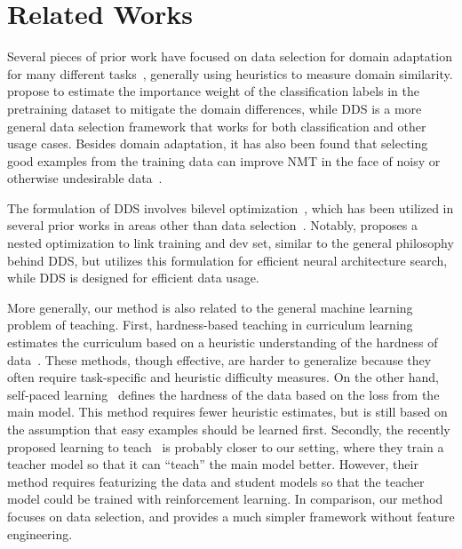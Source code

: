 \section{\label{sec:related_work}Related Works}

Several pieces of prior work have focused on data selection for domain adaptation for many different tasks~\citep{moore2010intelligent,axelrod2011domain,domain_adapt_transfer,jiang-zhai-2007-instance,foster-etal-2010-discriminative,wang-etal-2017-instance}, generally using heuristics to measure domain similarity.
\cite{domain_adapt_transfer} propose to estimate the importance weight of the classification labels in the pretraining dataset to mitigate the domain differences, while DDS is a more general data selection framework that works for both classification and other usage cases.
Besides domain adaptation, it has also been found that selecting good examples from the training data can improve NMT in the face of noisy or otherwise undesirable data~\citep{vyas-etal-2018-identifying,pham-etal-2018-fixing}.  

The formulation of DDS involves bilevel optimization~\citep{bilevel_optim,hier_optim}, which has been utilized in several prior works in areas other than data selection~\citep{darts,hyper_grad,finn2017model}.
Notably, \cite{darts} proposes a nested optimization to link training and dev set, similar to the general philosophy behind DDS, but utilizes this formulation for efficient neural architecture search, while DDS is designed for efficient data usage.

More generally, our method is also related to the general machine learning problem of teaching. First, hardness-based teaching in curriculum learning estimates the curriculum based on a heuristic understanding of the hardness of data~\citep{cl_bengio,automate_cl_GravesBMMK17,SpitkovskyAJ10,zhang2016boosting,zhang2018empirical,platanios19naacl,baysian_curriculum}. These methods, though effective, are harder to generalize because they often require task-specific and heuristic difficulty measures. On the other hand, self-paced learning~\citep{spl_visual_category,spl_kumar,spl_visual_category} defines the hardness of the data based on the loss from the main model. This method requires fewer heuristic estimates, but is still based on the assumption that easy examples should be learned first. Secondly, the recently proposed learning to teach~\citep{learn_to_teach} is probably closer to our setting, where they train a teacher model so that it can ``teach'' the main model better. However, their method requires featurizing the data and student models so that the teacher model could be trained with reinforcement learning. In comparison, our method focuses on data selection, and provides a much simpler framework without feature engineering. 

